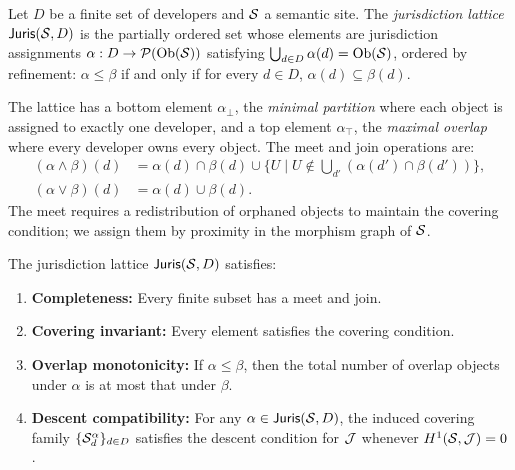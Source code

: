 \documentclass[11pt]{article}
\newcommand{\JurisCat}{\mathsf{Juris}}
\begin{document}
\begin{definition}
Let $D$ be a finite set of developers and $\mathcal{S}$ a semantic site. The
\emph{jurisdiction lattice} $\JurisCat(\Site, D)$ is the partially ordered set
whose elements are jurisdiction assignments $\alpha : D \to \mathcal{P}(\mathrm{Ob}(\mathcal{S}))$
satisfying $\bigcup_{d \in D} \alpha(d) = \mathrm{Ob}(\mathcal{S})$, ordered by refinement:
$\alpha \leq \beta$ if and only if for every $d \in D$,
$\alpha(d) \subseteq \beta(d)$.
\end{definition}

The lattice has a bottom element $\alpha_{\bot}$, the \emph{minimal partition}
where each object is assigned to exactly one developer, and a top element
$\alpha_{\top}$, the \emph{maximal overlap} where every developer owns every
object. The meet and join operations are:
\begin{align}
  (\alpha \wedge \beta)(d) &= \alpha(d) \cap \beta(d)
  \cup \{U \mid U \notin \textstyle\bigcup_{d'} (\alpha(d') \cap \beta(d'))\},
  \label{eq:juris-meet} \\
  (\alpha \vee \beta)(d) &= \alpha(d) \cup \beta(d).
  \label{eq:juris-join}
\end{align}
The meet requires a redistribution of orphaned objects to maintain the covering
condition; we assign them by proximity in the morphism graph of $\mathcal{S}$.

\begin{theorem}\label{thm:juris-lattice}
The jurisdiction lattice $\JurisCat(\Site, D)$ satisfies:
\begin{enumerate}
  \item \textbf{Completeness:} Every finite subset has a meet and join.
  \item \textbf{Covering invariant:} Every element satisfies the covering condition.
  \item \textbf{Overlap monotonicity:} If $\alpha \leq \beta$, then the total
        number of overlap objects under $\alpha$ is at most that under $\beta$.
  \item \textbf{Descent compatibility:} For any $\alpha \in \JurisCat(\Site, D)$,
        the induced covering family $\{\mathcal{S}_d^{\alpha}\}_{d \in D}$ satisfies
        the descent condition for $\mathcal{J}$ whenever $H^{1}(\mathcal{S}, \mathcal{J}) = 0$.
\end{enumerate}
\end{theorem}
\end{document}
